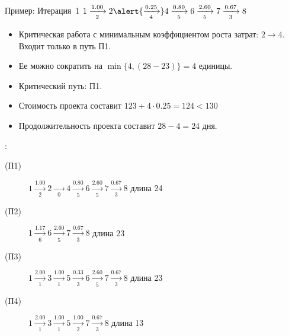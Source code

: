 \documentclass[unicode,11pt,notheorems]{beamer}
\begin{document}
\begin{frame}{Пример: Итерация~1}
	$1 \xrightarrow[2]{1.00}  2 \alert{\xrightarrow[4]{0.25}} 4 \xrightarrow[5]{0.80} 6 \xrightarrow[5]{2.60} 7 \xrightarrow[3]{0.67} 8$ 
	\begin{itemize}
	\item 
		Критическая работа с минимальным коэффициентом роста затрат:  $2 \to 4$.
		\hfill Входит только в путь П1.			
	\item 
		Ее можно сократить на $\min\{4,(28-23)\}=4$ единицы.	
		
	\item 
		Критический путь: П1.		
	\item 
		Стоимость проекта составит $123+4\cdot 0.25=124< 130$
	\item 
		Продолжительность проекта составит $28-4=24$ дня.		
\end{itemize}
:
\begin{description}
\item[(П1)]
	\alert{$1 \xrightarrow[2]{1.00}  2 \xrightarrow[0]{\phantom{0.25}} 4 \xrightarrow[5]{0.80} 6 \xrightarrow[5]{2.60} 7 \xrightarrow[3]{0.67} 8$}
	\hfill{} длина 24
\item[(П2)] 
	$1 \xrightarrow[6]{1.17}  6 \xrightarrow[5]{2.60} 7 \xrightarrow[3]{0.67} 8$
	\hfill{} длина 23
\item[(П3)] 
	$1 \xrightarrow[1]{2.00} 3 \xrightarrow[1]{1.00} 5 \xrightarrow[3]{0.33}  6 \xrightarrow[5]{2.60} 7 \xrightarrow[3]{0.67} 8$
	\hfill{} длина 23
\item[(П4)] 
	$1 \xrightarrow[1]{2.00} 3 \xrightarrow[1]{1.00} 5 \xrightarrow[2]{1.00} 7 \xrightarrow[3]{0.67} 8$
	\hfill{} длина 13
\end{description}

\end{frame}
\end{document}
